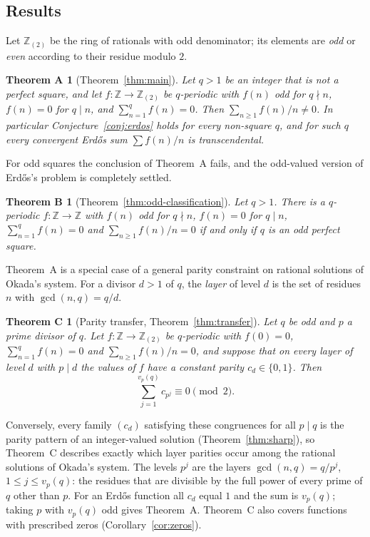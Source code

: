 \documentclass[11pt]{amsart}
\newtheorem*{mainA}{Theorem A}
\newtheorem*{mainB}{Theorem B}
\newtheorem*{mainC}{Theorem C}
\theoremstyle{definition}
\theoremstyle{remark}
\providecommand{\Z}{\mathbb Z}
\newcommand{\Zt}{\mathbb Z_{(2)}}
\numberwithin{equation}{section}
\begin{document}
\subsection{Results}
Let $\Zt$ be the ring of rationals with odd denominator; its elements are \emph{odd} or \emph{even} according to their residue modulo $2$.

\begin{mainA}[Theorem~\ref{thm:main}]
Let $q>1$ be an integer that is not a perfect square, and let $f\colon\Z\to\Zt$ be $q$-periodic with $f(n)$ odd for $q\nmid n$, $f(n)=0$ for $q\mid n$, and $\sum_{n=1}^{q}f(n)=0$.
Then $\sum_{n\ge1}f(n)/n\neq0$.
In particular Conjecture~\ref{conj:erdos} holds for every non-square $q$, and for such $q$ every convergent Erd\H{o}s sum $\sum f(n)/n$ is transcendental.
\end{mainA}

For odd squares the conclusion of Theorem~A fails, and the odd-valued version of Erd\H{o}s's problem is completely settled.

\begin{mainB}[Theorem~\ref{thm:odd-classification}]
Let $q>1$.
There is a $q$-periodic $f\colon\Z\to\Z$ with $f(n)$ odd for $q\nmid n$, $f(n)=0$ for $q\mid n$, $\sum_{n=1}^{q}f(n)=0$ and $\sum_{n\ge1}f(n)/n=0$ if and only if $q$ is an odd perfect square.
\end{mainB}

Theorem~A is a special case of a general parity constraint on rational solutions of Okada's system.
For a divisor $d>1$ of $q$, the \emph{layer} of level $d$ is the set of residues $n$ with $\gcd(n,q)=q/d$.

\begin{mainC}[Parity transfer, Theorem~\ref{thm:transfer}]
Let $q$ be odd and $p$ a prime divisor of $q$.
Let $f\colon\Z\to\Zt$ be $q$-periodic with $f(0)=0$, $\sum_{n=1}^qf(n)=0$ and $\sum_{n\ge1}f(n)/n=0$, and suppose that on every layer of level $d$ with $p\mid d$ the values of $f$ have a constant parity $c_d\in\{0,1\}$.
Then
\[
\sum_{j=1}^{v_p(q)}c_{p^j}\equiv0\pmod 2 .
\]
\end{mainC}

Conversely, every family $(c_d)$ satisfying these congruences for all $p\mid q$ is the parity pattern of an integer-valued solution (Theorem~\ref{thm:sharp}), so Theorem~C describes exactly which layer parities occur among the rational solutions of Okada's system.
The levels $p^j$ are the layers $\gcd(n,q)=q/p^j$, $1\le j\le v_p(q)$: the residues that are divisible by the full power of every prime of $q$ other than $p$.
For an Erd\H{o}s function all $c_d$ equal $1$ and the sum is $v_p(q)$; taking $p$ with $v_p(q)$ odd gives Theorem~A.
Theorem~C also covers functions with prescribed zeros (Corollary~\ref{cor:zeros}).
\end{document}
